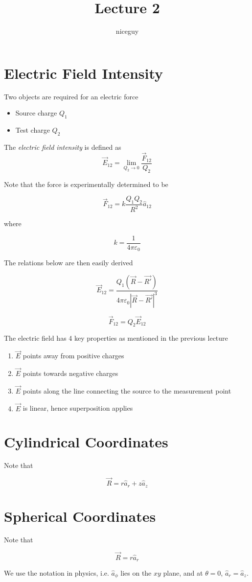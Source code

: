 \documentclass[12pt]{article}
\author{niceguy}
\title{Lecture 2}
\begin{document}
\maketitle

\section{Electric Field Intensity}

Two objects are required for an electric force

\begin{itemize}
	\item Source charge $Q_1$
	\item Test charge $Q_2$
\end{itemize}

\begin{defn}
	The \emph{electric field intensity} is defined as
	$$\vec{E}_{12} = \lim_{Q_2\rightarrow 0} \frac{\vec{F}_{12}}{Q_2}$$
\end{defn}

Note that the force is experimentally determined to be

$$\vec{F}_{12} = k\frac{Q_1Q_2}{R^2}\hat{a}_{12}$$

where

$$k = \frac{1}{4\pi\varepsilon_0}$$

The relations below are then easily derived

$$\vec{E}_{12} = \frac{Q_1(\vec{R} - \vec{R'})}{4\pi\varepsilon_0|\vec{R} - \vec{R'}|^3} $$

$$\vec{F}_{12} = Q_2\vec{E}_{12}$$

The electric field has 4 key properties as mentioned in the previous lecture

\begin{enumerate}
	\item $\vec{E}$ points away from positive charges
	\item $\vec{E}$ points towards negative charges
	\item $\vec{E}$ points along the line connecting the source to the measurement point
	\item $\vec{E}$ is linear, hence superposition applies
\end{enumerate}

\section{Cylindrical Coordinates}

Note that

$$\vec{R} = r\hat{a}_r + z\hat{a}_z$$

\section{Spherical Coordinates}

Note that

$$\vec{R} = r\hat{a}_r$$

We use the notation in physics, i.e. $\hat{a}_{\phi}$ lies on the $xy$ plane, and at $\theta=0$, $\hat{a}_r = \hat{a}_z$.
\end{document}
